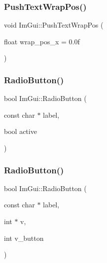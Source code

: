 \hypertarget{namespace_im_gui_ab3b203dc94e7ee61a524609b3f3be50a}{}\label{namespace_im_gui_ab3b203dc94e7ee61a524609b3f3be50a} 
\subsubsection{\texorpdfstring{Push\+Text\+Wrap\+Pos()}{PushTextWrapPos()}}
{\footnotesize\ttfamily void Im\+Gui\+::\+Push\+Text\+Wrap\+Pos (\begin{DoxyParamCaption}\item[{float}]{wrap\+\_\+pos\+\_\+x = {\ttfamily 0.0f} }\end{DoxyParamCaption})}

\hypertarget{namespace_im_gui_a6b146763845cbad5a4144772279631bc}{}\label{namespace_im_gui_a6b146763845cbad5a4144772279631bc} 
\subsubsection{\texorpdfstring{Radio\+Button()}{RadioButton()}\hspace{0.1cm}{\footnotesize\ttfamily [1/2]}}
{\footnotesize\ttfamily bool Im\+Gui\+::\+Radio\+Button (\begin{DoxyParamCaption}\item[{const char $\ast$}]{label,  }\item[{bool}]{active }\end{DoxyParamCaption})}

\hypertarget{namespace_im_gui_a018d2b61d2f00bb7a9dd2b1f933b93a5}{}\label{namespace_im_gui_a018d2b61d2f00bb7a9dd2b1f933b93a5} 
\subsubsection{\texorpdfstring{Radio\+Button()}{RadioButton()}\hspace{0.1cm}{\footnotesize\ttfamily [2/2]}}
{\footnotesize\ttfamily bool Im\+Gui\+::\+Radio\+Button (\begin{DoxyParamCaption}\item[{const char $\ast$}]{label,  }\item[{int $\ast$}]{v,  }\item[{int}]{v\+\_\+button }\end{DoxyParamCaption})}

